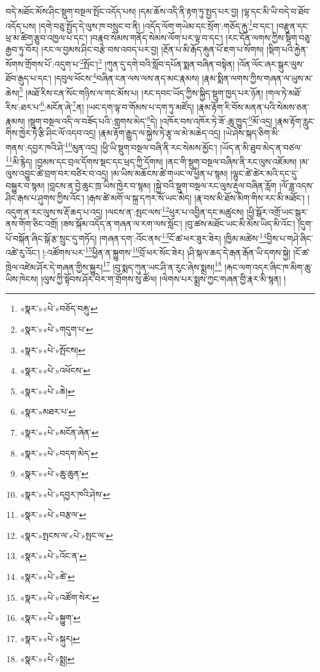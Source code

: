 བདེ་མཐོང་མོས་ཤིང་སྡུག་བསྔལ་སྤོང་འདོད་པས། །དམ་ཆོས་འདི་ནི་རྟག་ཏུ་སྤྱད་པར་བྱ། །ལྷ་དང་མི་ཡི་བདེ་བ་ཐོབ་འདོད་པས། །དགེ་བཅུ་སྤྱོད་དེ་ལུས་ཁ་བསྲུང་བ་ནི། །འདོད་ལོག་གཡེམ་དང་སྲོག་:གཅོད་རྐུ་\footnote{«སྣར་»«པེ་»བཅོད་བརྐུ་}བ་དང་། །བརྫུན་དང་ཕྲ་མ་ཚིག་རྩུབ་འཁྱལ་པ་དང་། །བརྣབ་སེམས་གནོད་སེམས་ལོག་པར་ལྟ་བ་དང་། །རང་དོན་ལགས་ཀྱིས་སྡིག་བཅུ་རྒྱབ་ཏུ་བོར། །རང་ལ་བྱམས་ཤིང་བརྩེ་བས་འབད་པར་བྱ། །རྔོན་པ་མི་རྒོད་རྐུན་པོ་ཇག་པ་སོགས། །སྡིག་པའི་རྐྱེན་སོགས་གྲོགས་པོ་:འདུག་པ་\footnote{«སྣར་»«པེ་»གདུག་པ་}སྤོང་།\footnote{«སྣར་»«པེ་»སྤོངས།} །ཀུན་དུ་དགེ་བའི་སློབ་དཔོན་སྨན་བཞིན་བསྟེན། །འོན་ལོང་ཞར་སྒུར་ལུས་ཐོབ་རྒུད་པ་དང་། །དབུལ་ཕོངས་\footnote{«སྣར་»«པེ་»འཕོངས་}བཞིན་ངན་ལས་ལས་ནད་མང་རྣམས། །རྣམ་སྨིན་ལགས་ཀྱིས་གཞན་ལ་ཡུས་མ་ཆེས།\footnote{«སྣར་»«པེ་»ཆེ།} །མཐོ་རིས་ངན་སོང་གཉིས་ལ་གང་མོས་པ། །རང་དབང་ཡོད་ཀྱིས་སྐྱིད་སྡུག་ཁྱད་པར་ཉོན། །གལ་ཏེ་མཐོ་རིས་:ཐར་པ་\footnote{«སྣར་»མཐར་པ་}:མངོན་ཞེ་\footnote{«སྣར་»«པེ་»མངོན་ཞེན་}ན། །ཡང་དག་ལྟ་བ་གོམས་པ་དག་ཏུ་མཛོད། །རྣམ་རྟོག་རི་བོས་མནན་པའི་སེམས་ཅན་རྣམས། །སྡུག་བསྔལ་འདི་ལ་བཟོད་པའི་:གླགས་མེད་\footnote{«སྣར་»«པེ་»བདག་མེད་}དེ། །འཁོར་བས་འཁོར་ཏེ་ཟོ་:ཆུ་ཁྱུད་\footnote{«སྣར་»«པེ་»ཆུ་ཆུན་}མོ་འདྲ། །རྣམ་རྟོག་རླུང་གིས་ཁྱེར་ཏེ་རྩི་ཤིང་ལོ་འདབ་འདྲ། །རྣམ་རྟོག་རྒྱུད་ལ་སྐྱེས་ཏེ་རྩྭ་ལ་མེ་མཆེད་འདྲ། །ཡེ་ཤེས་སྐད་ཅིག་མི་གནས་:དབྱར་ཁའི་ཤེ་\footnote{«སྣར་»«པེ་»དབྱར་ཁའི་ཤེས་}མུན་འདྲ། །ཕྱི་ཡི་སྡུག་བསྔལ་བཞི་ནི་རང་སེམས་མྱོང་། །ཡོད་ན་མི་ཐུབ་མེད་ན་བཙལ་\footnote{«སྣར་»«པེ་»བརྩལ་}མི་རྙེད། །བྱམས་དང་བྲལ་དོགས་སྡང་དང་ཕྲད་ཀྱི་དོགས། །ནང་གི་སྡུག་བསྔལ་བཞིས་ནི་རང་ལུས་འཇོམས། །མ་ལུས་འབྱུང་ཚེ་བྲག་བར་བཙིར་བ་འདྲ། །མ་ཡིས་མཆོངས་ཚེ་གཡང་ལ་ཕྱིན་པ་སྙམ། །ལྷུང་ཚེ་ཚེར་མའི་དང་དུ་བསྐྱུར་བ་སྙམ། །བླངས་ན་བྱེ་ཆུང་ཁྲ་ཡིས་ཁྱེར་བ་སྙམ། །སྐྱེ་བའི་སྡུག་བསྔལ་རང་ལུས་རྡུལ་བཞིན་རློག །ལོ་ཟླ་འདས་ཤིང་རྒས་པ་ཤུགས་ཀྱིས་འོང་། །རྒས་ཚེ་མགོ་ལ་སྐྲ་དཀར་སོ་ཡང་མེད། །རྣ་བས་མི་ཐོས་མིག་གིས་རང་མི་མཐོང་། །འདུག་ན་རང་ལུས་ས་རྡོ་ཆད་པ་འདྲ། །ལངས་ན་:སྤང་ལས་\footnote{«སྣར་»སྤངས་ལ་«པེ་»སྤང་ལ་}ཕུར་པ་འབྱིན་དང་མཚུངས། །ཕྱི་སྒོར་འགྲོ་ཡང་སྒུར་ནས་གོག་ཅིང་འགྲོ། །ཟས་སྐོམ་འདོད་ན་གཞན་ལ་རག་ལས་སློང་། །བུ་ཚས་མཐོང་ཡང་མི་མོས་ཡིད་མི་འོང་། །དུག་པོ་བསྐོན་ཞིང་སྒོ་རྩ་སྲུང་དུ་གཏོད། །གཞན་དག་:འོང་ནས་\footnote{«སྣར་»«པེ་»འོང་ན་}ངོ་ཚ་ཕར་ཟུར་ཟེར། །ཁྱིམ་མཚེས་\footnote{«སྣར་»«པེ་»ཚེ་}བྱིས་པ་གཤེ་ཞིང་འཚེ་རུ་འོང་། །:འཚོགས་པར་\footnote{«སྣར་»«པེ་»འཚོག་སེར་}ཕྱིན་ན་སྐྱུགས་\footnote{«སྣར་»«པེ་»སྐྱུག་}བྲོ་ཕར་སོང་ཟེར། །ཤི་སྐལ་ཆད་དེ་རྒན་རྒོན་ཡི་དགས་སྐྱེ། །ངོ་ཚ་ཁྲེལ་འཛེམ་ཤོར་དེ་གཞན་གྱིས་སྐྱུར།\footnote{«སྣར་»«པེ་»སྐུར།} །བུ་སྨད་ཀུན་ཡང་ཤི་ན་རུང་ཞེས་སྨྲས།\footnote{«སྣར་»«པེ་»སྨྲ།} །རྐང་ལག་འདར་ཞིང་ཁ་མིག་ཆུ་ཡིས་ཁེངས། །ལུས་ཀྱི་སྟོབས་ཤོར་བེར་ག་གྲོགས་སུ་ཚོལ། །ལེགས་པར་སྨྲས་ཀྱང་གཞན་གྱི་རྣར་མི་སྙན། །
